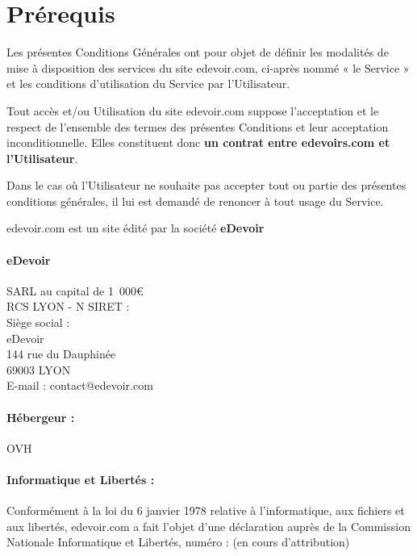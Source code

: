 \maketitle

\section{Prérequis}

Les présentes Conditions Générales ont pour objet de définir les modalités de mise à disposition des services du site edevoir.com, ci-après nommé « le Service » et les conditions d'utilisation du Service par l'Utilisateur.

Tout accès et/ou Utilisation du site edevoir.com suppose l'acceptation et le respect de l'ensemble des termes des présentes Conditions et leur acceptation inconditionnelle. Elles constituent donc \textbf{un contrat entre edevoirs.com et l’Utilisateur}.

Dans le cas où l’Utilisateur ne souhaite pas accepter tout ou partie des présentes conditions générales, il lui est demandé de renoncer à tout usage du Service.

edevoir.com est un site édité par la société \textbf{eDevoir}

\paragraph*{eDevoir}
SARL au capital de 1~000\euro\\
RCS LYON - N SIRET : \\
Siège social :\\
eDevoir\\
144 rue du Dauphinée\\
69003 LYON\\
E-mail : contact@edevoir.com

\paragraph*{Hébergeur :} OVH

\paragraph*{Informatique et Libertés :}
Conformément à la loi du 6 janvier 1978 relative à l'informatique, aux fichiers et aux libertés, edevoir.com a fait l’objet d’une déclaration auprès de la Commission Nationale Informatique et Libertés, numéro : (en cours d'attribution)

